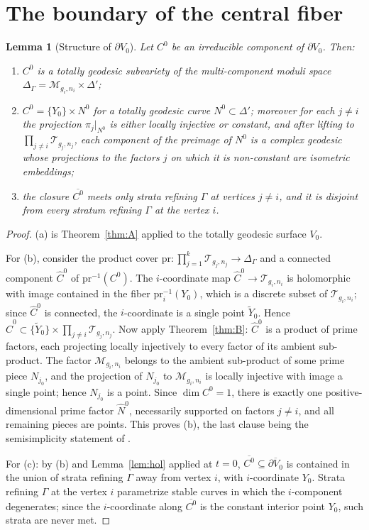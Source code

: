\documentclass[11pt]{amsart}
\newtheorem{lemma}[theorem]{Lemma}
\theoremstyle{definition}
\theoremstyle{remark}
\newcommand{\M}{\mathcal{M}}
\newcommand{\T}{\mathcal{T}}
\begin{document}
\section{The boundary of the central fiber}

\begin{lemma}[Structure of $\partial V_0$]\label{lem:structure}
Let $C^0$ be an irreducible component of $\partial V_0$. Then:
\begin{enumerate}
\item[(a)] $C^0$ is a totally geodesic subvariety of the multi-component
moduli space $\Delta_\Gamma=\M_{g_i,n_i}\times\Delta'$;
\item[(b)] $C^0=\{Y_0\}\times N^0$ for a totally geodesic curve
$N^0\subset\Delta'$; moreover for each $j\neq i$ the projection
$\pi_j|_{N^0}$ is either locally injective or constant, and after lifting
to $\prod_{j\neq i}\T_{g_j,n_j}$, each component of the preimage of $N^0$ is
a complex geodesic whose projections to the factors $j$ on which it is
non-constant are isometric embeddings;
\item[(c)] the closure $\overline{C^0}$ meets only strata refining
$\Gamma$ at vertices $j\neq i$, and it is disjoint from every stratum
refining $\Gamma$ at the vertex $i$.
\end{enumerate}
\end{lemma}

\begin{proof}
(a) is Theorem~\ref{thm:A} applied to the totally geodesic surface $V_0$.

For (b), consider the product cover
$\mathrm{pr}:\prod_{j=1}^k\T_{g_j,n_j}\to\Delta_\Gamma$ and a connected
component $\hat C^0$ of $\mathrm{pr}^{-1}(C^0)$. The $i$-coordinate map
$\hat C^0\to\T_{g_i,n_i}$ is holomorphic with image contained in the fiber
$\mathrm{pr}_i^{-1}(Y_0)$, which is a discrete subset of
$\T_{g_i,n_i}$; since $\hat C^0$ is connected, the $i$-coordinate is a
single point $\tilde Y_0$. Hence
$\hat C^0\subset\{\tilde Y_0\}\times\prod_{j\neq i}\T_{g_j,n_j}$. Now apply
Theorem~\ref{thm:B}: $\hat C^0$ is a product of prime factors, each
projecting locally injectively to every factor of its ambient sub-product.
The factor $\M_{g_i,n_i}$ belongs to the ambient sub-product of some prime
piece $N_{j_0}$, and the projection of $N_{j_0}$ to $\M_{g_i,n_i}$ is
locally injective with image a single point; hence $N_{j_0}$ is a point.
Since $\dim C^0=1$, there is exactly one positive-dimensional prime factor
$\hat N^0$, necessarily supported on factors $j\neq i$, and all remaining
pieces are points. This proves (b), the last clause being the semisimplicity
statement of \cite[Thm.~1.3]{AW}.

For (c): by (b) and Lemma~\ref{lem:hol} applied at $t=0$,
$\overline{C^0}\subseteq\overline{\partial V_0}$ is contained in the union
of strata refining $\Gamma$ away from vertex $i$, with $i$-coordinate
$Y_0$. Strata refining $\Gamma$ at the vertex $i$ parametrize stable curves
in which the $i$-component degenerates; since the $i$-coordinate along
$\overline{C^0}$ is the constant interior point $Y_0$, such strata are
never met.
\end{proof}
\end{document}
